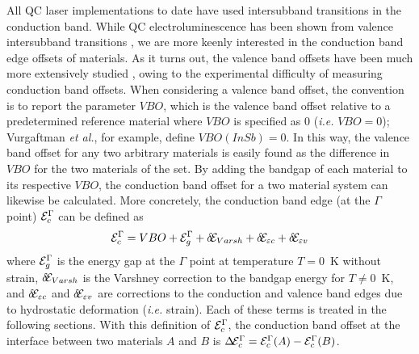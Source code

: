\documentclass[12pt]{report}
\begin{document}
All QC laser implementations to date have used intersubband transitions in the conduction band.  While QC electroluminescence has been shown from valence intersubband transitions \cite{Dehlinger:Science:2000:Sige} \cite{Malis:APL:2006}, we are more keenly interested in the conduction band edge offsets of materials.  As it turns out, the valence band offsets have been much more extensively studied \cite{Vurgaftman}, owing to the experimental difficulty of measuring conduction band offsets.  When considering a valence band offset, the convention is to report the parameter $VBO$, which is the valence band offset relative to a predetermined reference material where $VBO$ is specified as 0 (\emph{i.e.} $VBO=0$); Vurgaftman \emph{et al.}, for example, define $VBO({InSb})=0$.  In this way, the valence band offset for any two arbitrary materials is easily found as the difference in $VBO$ for the two materials of the set.  By adding the bandgap of each material to its respective $VBO$, the conduction band offset for a two material system can likewise be calculated.  More concretely, the conduction band edge (at the $\Gamma$ point) $\EE_c^\Gamma$ can be defined as
\begin{equation}
\EE_c^\Gamma = VBO + \EE_g^\Gamma + \delta\!\EE_{Varsh} + \delta\!\EE_{\varepsilon c} + \delta\!\EE_{\varepsilon v}
\end{equation}
where $\EE_g^\Gamma$ is the energy gap at the $\Gamma$ point at temperature $T=0$~K without strain, $\delta\!\EE_{Varsh}$ is the Varshney correction to the bandgap energy for $T\neq0$~K, and $\delta\!\EE_{\varepsilon c}$ and $\delta\!\EE_{\varepsilon v}$ are corrections to the conduction and valence band edges due to hydrostatic deformation (\emph{i.e.} strain).  Each of these terms is treated in the following sections.  With this definition of $\EE_c^\Gamma$, the conduction band offset at the interface between two materials $A$ and $B$ is $\Delta\!\EE_c^\Gamma=\EE_c^\Gamma(A)-\EE_c^\Gamma(B)$.

\end{document}

